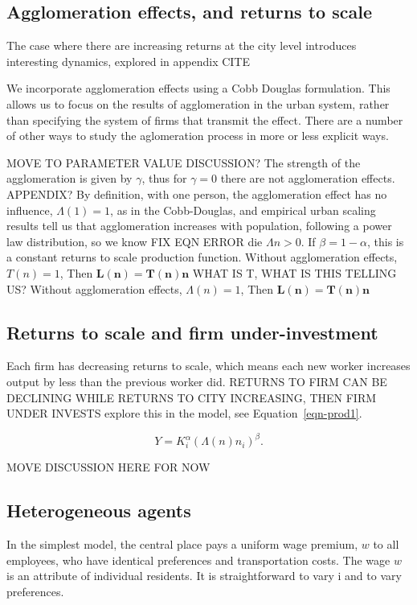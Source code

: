 \subsection{Agglomeration effects, and returns to scale}
The case where there are increasing returns at the city level introduces interesting dynamics, explored in appendix CITE %

We incorporate agglomeration effects using a Cobb Douglas formulation. This allows us to focus on the results of agglomeration in the urban system, rather than specifying the system of firms that transmit the effect. 
There are a number of other ways to study the aglomeration process in more or less explicit ways.

MOVE TO PARAMETER VALUE DISCUSSION?
The strength of the agglomeration is given by $\gamma$, thus for $\gamma=0$ there are not agglomeration effects. APPENDIX?
By definition, with one person, the agglomeration effect has no influence, $\Lambda(1)=1$,  as in the \gls{Cobb-Douglas}, and empirical urban scaling results tell us that agglomeration increases with population, following a power law distribution, so we know %
FIX EQN ERROR die ${\Lambda}{n}>0$. 
If $\beta=1-\alpha$, this is a \gls{constant returns to scale} production function. Without agglomeration effects, $T(n)=1$,  Then  \textbf{$\mathbf{L(n) = T(n) n}$}  WHAT IS T, WHAT IS THIS TELLING US?
Without agglomeration effects, $\Lambda(n)=1$,  Then  \textbf{$\mathbf{L(n) = T(n) n}$} 


\subsection{Returns to scale and firm under-investment}
Each firm has \gls{decreasing returns to scale}, which means each new worker increases output by less than the previous worker did.
RETURNS TO FIRM CAN BE DECLINING WHILE RETURNS TO CITY INCREASING, THEN FIRM UNDER INVESTS
explore this in the model, see Equation~\ref{eqn-prod1}.

\begin{equation}
Y=K_i^{\alpha }(\Lambda(n)n_i)^{\beta }.
\end{equation}

MOVE DISCUSSION HERE FOR NOW

\subsection{Heterogeneous agents}
In the simplest model, the central place pays a uniform wage premium, $w$ to all employees, who have identical preferences and transportation costs. 
The wage $w$ is an attribute of individual residents.  
It is straightforward to vary i and to vary preferences. 

